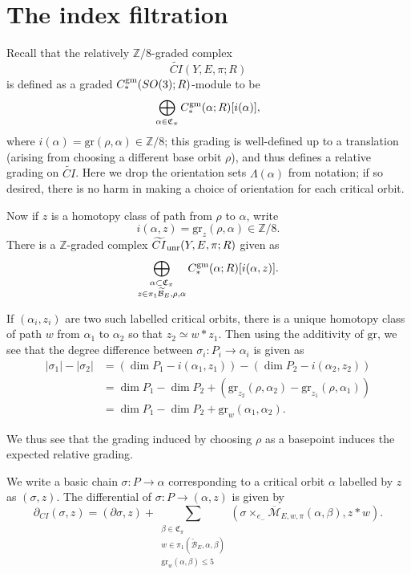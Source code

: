 \documentclass{memo-l}
\theoremstyle{definition}
\theoremstyle{remark}
\numberwithin{section}{chapter}
\numberwithin{equation}{chapter}
\begin{document}
\section{The index filtration}\label{sec:Floer-filt}
Recall that the relatively $\mathbb Z/8$-graded complex $$\widetilde{CI}(Y,E,\pi;R)$$ is defined as a graded $C_*^{\textup{gm}}(SO(3);R)$-module to be $$\bigoplus_{\alpha \in \mathfrak C_\pi} C_{*}^{\textup{gm}}(\alpha;R)[i(\alpha)],$$ where $i(\alpha) = \text{gr}(\rho, \alpha) \in \mathbb Z/8$; this grading is well-defined up to a translation (arising from choosing a different base orbit $\rho$), and thus defines a relative grading on $\widetilde{CI}$. Here we drop the orientation sets $\Lambda(\alpha)$ from notation; if so desired, there is no harm in making a choice of orientation for each critical orbit.

Now if $z$ is a homotopy class of path from $\rho$ to $\alpha$, write $$i(\alpha,z) = \text{gr}_z(\rho, \alpha) \in \mathbb Z/8.$$ There is a $\mathbb Z$-graded complex $\widetilde{CI}_\textup{unr}(Y,E,\pi;R)$ given as $$\bigoplus_{\substack{\alpha \subset \mathfrak C_\pi\\z \in \pi_1\widetilde{\mathcal B}_E, \rho, \alpha}} C_{*}^{\textup{gm}}(\alpha;R)[i(\alpha,z)].$$

If $(\alpha_i, z_i)$ are two such labelled critical orbits, there is a unique homotopy class of path $w$ from $\alpha_1$ to $\alpha_2$ so that $z_2 \simeq w \ast z_1$. Then using the additivity of $\text{gr}$, we see that the degree difference between $\sigma_i: P_i \to \alpha_i$ is given as \begin{align*}|\sigma_1| - |\sigma_2| &= \left(\dim P_1 - i(\alpha_1, z_1)\right) - \left(\dim P_2 - i(\alpha_2, z_2)\right)\\
&= \dim P_1 - \dim P_2 + \left(\text{gr}_{z_2}(\rho, \alpha_2) - \text{gr}_{z_1}(\rho, \alpha_1)\right)\\
&= \dim P_1 - \dim P_2 + \text{gr}_w(\alpha_1, \alpha_2).\end{align*}

We thus see that the grading induced by choosing $\rho$ as a basepoint induces the expected relative grading.

We write a basic chain $\sigma: P \to \alpha$ corresponding to a critical orbit $\alpha$ labelled by $z$ as $(\sigma, z)$. The differential of $\sigma: P \to (\alpha, z)$ is given by $$\partial_{CI}(\sigma, z) = (\partial \sigma, z) + \sum_{\substack{\beta \in \mathfrak C_\pi\\w \in \pi_1(\widetilde{\mathcal B}_E, \alpha, \beta)\\ \text{gr}_w(\alpha, \beta) \leq 5}}\!\!\! \left(\sigma \times_{e_-} \overline{\mathcal M}_{E,w,\pi}(\alpha, \beta),z \ast w\right).$$
\end{document}
